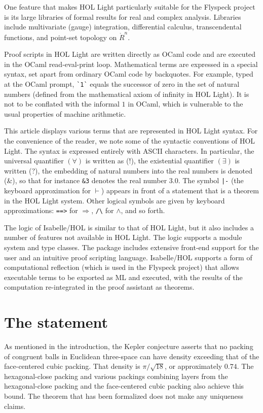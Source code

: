 One feature that makes HOL Light particularly suitable for the
Flyspeck project is its large libraries of formal results for real and
complex analysis.  Libraries include multivariate (gauge) integration,
differential calculus, transcendental functions, and point-set
topology on $\ring{R}^n$.

Proof scripts in HOL Light are written directly as OCaml code and
are executed in the OCaml read-eval-print loop.  Mathematical
terms are expressed in a special syntax, set apart from ordinary OCaml
code by backquotes.  For example, typed at the OCaml prompt,
\verb!`1`!  equals the successor of zero in the set of natural numbers
(defined from the mathematical axiom of infinity in HOL Light).
It is not to be conflated with the informal $1$ in OCaml, which is
vulnerable to the usual properties of machine arithmetic.

This article displays various terms that are represented in HOL Light
syntax.  For the convenience of the reader, we note some of the
syntactic conventions of HOL Light.  The syntax is expressed entirely
with ASCII characters.  In particular, the universal
quantifier $(\forall)$ is written as (!), the existential quantifier
$(\exists)$ is written (?), the embedding of natural numbers into the
real numbers is denoted (\&), so that for instance \verb!&3! denotes
the real number $3.0$.  The symbol \verb!|-! (the keyboard
approximation for $\vdash$) appears in front of a statement that is a
theorem in the HOL Light system.  Other logical symbols are given by
keyboard approximations: \verb!==>! for $\Longrightarrow$, \verb!/\!
for $\land$, and so forth.

The logic of Isabelle/HOL is similar to that of HOL Light, but it
also includes a number of features not available in HOL Light.  The logic
supports a module system and type classes.  The package includes
extensive front-end support for the user and an intuitive proof
scripting language.  Isabelle/HOL supports a form of computational
reflection (which is used in the Flyspeck project) that allows
executable terms to be exported as ML and executed, with the results
of the computation re-integrated in the proof assistant as theorems.


\section{The statement}\label{sec:statement}

As mentioned in the introduction, the Kepler conjecture asserts that
no packing of congruent balls in Euclidean three-space can have
density exceeding that of the face-centered cubic packing.  That
density is $\pi/\sqrt{18}$, or approximately $0.74$.  The
hexagonal-close packing and various packings combining layers from the
hexagonal-close packing and the face-centered cubic packing also
achieve this bound.  The theorem that has been formalized does not
make any uniqueness claims.

